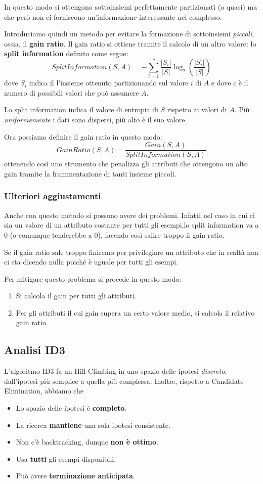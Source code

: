 In questo modo si ottengono sottoinsiemi perfettamente partizionati (o quasi) ma che per\`o non ci forniscono
un'informazione interessante nel complesso.

Introduciamo quindi un metodo per evitare la formazione di sottoinsiemi \emph{piccoli}, ossia, il \textbf{gain ratio}. Il
gain ratio si ottiene tramite il calcolo di un altro valore: lo \textbf{split information} definito come segue:
\[ SplitInformation(S, A) = -\sum_{i=1}^c \frac{|S_i|}{|S|} \log_2 \left(\frac{|S_i|}{|S|}\right) \]
dove $S_i$ indica il l'insieme ottenuto partizionando sul valore $i$ di $A$ e dove $c$ \`e il numero di possibili valori
che pu\`o assumere $A$.

Lo split information indica il valore di entropia di $S$ rispetto ai valori di $A$. Pi\`u \emph{uniformemente} i dati sono
dispersi, pi\`u alto \`e il suo valore.

Ora possiamo definire il gain ratio in questo modo:
\[ GainRatio(S, A) = \frac{Gain(S, A)}{SplitInformation(S, A)} \]
ottenendo cos\`i uno strumento che penalizza gli attributi che ottengono un alto gain tramite la frammentazione di tanti
insieme piccoli.

\subsubsection{Ulteriori aggiustamenti}
Anche con questo metodo si possono avere dei problemi. Infatti nel caso in cui ci sia un valore di un attributo costante
per tutti gli esempi,lo split information va a 0 (o comunque tenderebbe a 0), facendo cos\`i salire troppo il gain ratio.

Se il gain ratio sale troppo finiremo per privilegiare un attributo che in realt\`a non ci sta dicendo nulla poich\'e
\`e uguale per tutti gli esempi.

Per mitigare questo problema si procede in questo modo:
\begin{enumerate}
	\item Si calcola il gain per tutti gli attributi.
	\item Per gli attributi il cui gain supera un certo valore medio, si calcola il relativo gain ratio.
\end{enumerate}

\subsection{Analisi ID3}
L'algoritmo ID3 fa un Hill-Climbing in uno spazio delle ipotesi \emph{discreto}, dall'ipotesi pi\`u semplice a quella
pi\`u complessa. Inoltre, rispetto a Candidate Elimination, abbiamo che
\begin{itemize}
	\item Lo spazio delle ipotesi \`e \textbf{completo}.
	\item La ricerca \textbf{mantiene} una sola ipotesi consistente.
	\item Non c'\`e backtracking, dunque \textbf{non \`e ottimo}.
	\item Usa \textbf{tutti} gli esempi disponibili.
	\item Pu\`o avere \textbf{terminazione anticipata}.
\end{itemize}


